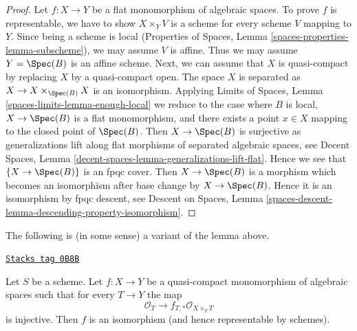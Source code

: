 \begin{proof}
Let $f : X \to Y$ be a flat monomorphism of algebraic spaces.
To prove $f$ is representable, we have to show
$X \times_Y V$ is a scheme for every scheme $V$ mapping to $Y$.
Since being a scheme is local (Properties of Spaces,
Lemma \ref{spaces-properties-lemma-subscheme}), we may
assume $V$ is affine. Thus we may assume $Y = \Spec(B)$
is an affine scheme. Next, we can assume that $X$ is quasi-compact
by replacing $X$ by a quasi-compact open. The space $X$ is
separated as $X \to X \times_{\Spec(B)} X$ is an isomorphism.
Applying Limits of Spaces, Lemma \ref{spaces-limits-lemma-enough-local}
we reduce to the case where $B$ is local, $X \to \Spec(B)$ is a
flat monomorphism, and
there exists a point $x \in X$ mapping to the closed point of $\Spec(B)$.
Then $X \to \Spec(B)$ is surjective as generalizations
lift along flat morphisms of separated algebraic spaces, see
Decent Spaces, Lemma \ref{decent-spaces-lemma-generalizations-lift-flat}.
Hence we see that $\{X \to \Spec(B)\}$ is an fpqc cover.
Then $X \to \Spec(B)$ is a morphism which becomes an isomorphism
after base change by $X \to \Spec(B)$. Hence it is an isomorphism by
fpqc descent, see Descent on Spaces, Lemma
\ref{spaces-descent-lemma-descending-property-isomorphism}.
\end{proof}

The following is (in some sense) a variant of the lemma above.

\begin{lemma}[Ui case]
\label{spaces-more-morphisms-lemma-ui-case}
\href{https://stacks.math.columbia.edu/tag/0B8B}{\texttt{Stacks tag 0B8B}}

Let $S$ be a scheme. Let $f : X \to Y$ be a quasi-compact monomorphism
of algebraic spaces such that for every $T \to Y$ the map
$$
\mathcal{O}_T \to f_{T,*}\mathcal{O}_{X \times_Y T}
$$
is injective. Then $f$ is an isomorphism (and hence representable by schemes).
\end{lemma}

